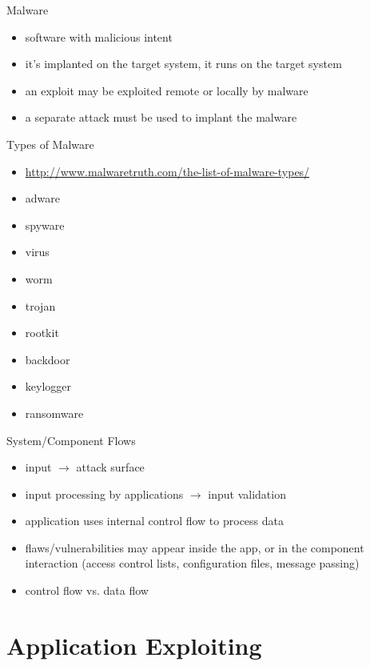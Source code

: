 \documentclass{curs}
\begin{document}
\begin{frame}{Malware}
  \begin{itemize}
    \pause \item software with malicious intent
    \pause \item it's implanted on the target system, it runs on the target system
    \pause \item an exploit may be exploited remote or locally by malware
    \pause \item a separate attack must be used to implant the malware
  \end{itemize}
\end{frame}

\begin{frame}{Types of Malware}
  \begin{itemize}
    \pause \item \url{http://www.malwaretruth.com/the-list-of-malware-types/}
    \pause \item adware
    \pause \item spyware
    \pause \item virus
    \pause \item worm
    \pause \item trojan
    \pause \item rootkit
    \pause \item backdoor
    \pause \item keylogger
    \pause \item ransomware
  \end{itemize}
\end{frame}

\begin{frame}{System/Component Flows}
  \begin{itemize}
    \pause \item input $\rightarrow$ attack surface
    \pause \item input processing by applications $\rightarrow$ input validation
    \pause \item application uses internal control flow to process data
    \pause \item flaws/vulnerabilities may appear inside the app, or in the component interaction (access control lists, configuration files, message passing)
    \pause \item control flow vs. data flow
  \end{itemize}
\end{frame}

\section{Application Exploiting}
\end{document}

